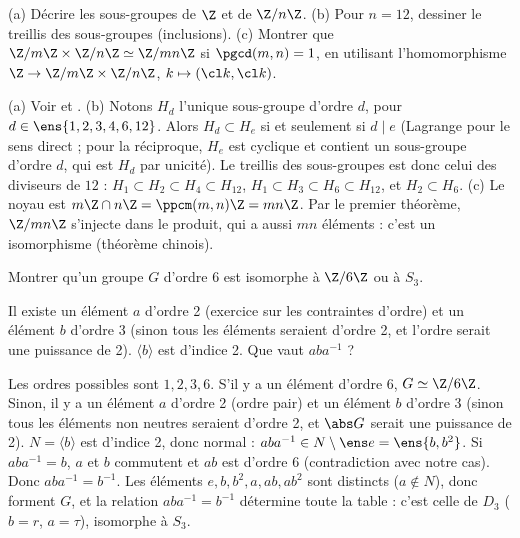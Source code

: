 \begin{exo}[A][De $\Z$ à $\Z/n\Z$]
(a) Décrire les sous-groupes de $\Z$ et de $\Z/n\Z$. (b) Pour $n=12$, dessiner le treillis des sous-groupes (inclusions). (c) Montrer que $\Z/m\Z\times\Z/n\Z\simeq\Z/mn\Z$ si $\pgcd(m,n)=1$, en utilisant l'homomorphisme $\Z\to\Z/m\Z\times\Z/n\Z$, $k\mapsto(\cl k,\cl k)$.
\begin{corrige}
(a) Voir  et . (b) Notons $H_d$ l'unique sous-groupe d'ordre $d$, pour $d\in\ens{1,2,3,4,6,12}$. Alors $H_d\subset H_e$ si et seulement si $d\mid e$ (Lagrange pour le sens direct ; pour la réciproque, $H_e$ est cyclique et contient un sous-groupe d'ordre $d$, qui est $H_d$ par unicité). Le treillis des sous-groupes est donc celui des diviseurs de $12$ : $H_1\subset H_2\subset H_4\subset H_{12}$, $H_1\subset H_3\subset H_6\subset H_{12}$, et $H_2\subset H_6$. (c) Le noyau est $m\Z\cap n\Z=\ppcm(m,n)\Z=mn\Z$. Par le premier théorème, $\Z/mn\Z$ s'injecte dans le produit, qui a aussi $mn$ éléments : c'est un isomorphisme (théorème chinois).
\end{corrige}
\end{exo}
\begin{exo}
Montrer qu'un groupe $G$ d'ordre 6 est isomorphe à $\Z/6\Z$ ou à $S_3$.
\begin{indication}
Il existe un élément $a$ d'ordre 2 (exercice sur les contraintes d'ordre) et un élément $b$ d'ordre 3 (sinon tous les éléments seraient d'ordre 2, et l'ordre serait une puissance de 2). $\langle b\rangle$ est d'indice 2. Que vaut $aba^{-1}$ ?
\end{indication}
\begin{corrige}
Les ordres possibles sont $1,2,3,6$. S'il y a un élément d'ordre 6, $G\simeq\Z/6\Z$. Sinon, il y a un élément $a$ d'ordre 2 (ordre pair) et un élément $b$ d'ordre 3 (sinon tous les éléments non neutres seraient d'ordre 2, et $\abs G$ serait une puissance de 2). $N=\langle b\rangle$ est d'indice 2, donc normal : $aba^{-1}\in N\setminus\ens e=\ens{b,b^2}$. Si $aba^{-1}=b$, $a$ et $b$ commutent et $ab$ est d'ordre 6 (contradiction avec notre cas). Donc $aba^{-1}=b^{-1}$. Les éléments $e,b,b^2,a,ab,ab^2$ sont distincts ($a\notin N$), donc forment $G$, et la relation $aba^{-1}=b^{-1}$ détermine toute la table : c'est celle de $D_3$ ($b=r$, $a=\tau$), isomorphe à $S_3$.
\end{corrige}
\end{exo}
